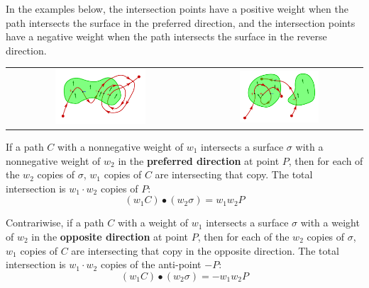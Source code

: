 \documentclass{book}
\begin{document}
In the examples below, the intersection points have a positive weight when the path intersects the surface in the preferred direction, and the intersection points have a negative weight when the path intersects the surface in the reverse direction.

\begin{tabular}{cc}
\includegraphics[width = 0.5\textwidth]{Intersections/Path-surface_intersections/path_surface_intersections}
& 
\includegraphics[width = 0.5\textwidth]{Intersections/Path-surface_intersections/path_surface_intersections_2}
\end{tabular}

If a path \(C\) with a nonnegative weight of \(w_1\) intersects a surface \(\sigma\) with a nonnegative weight of \(w_2\) in the {\bf preferred direction} at point \(P\), then for each of the \(w_2\) copies of \(\sigma\), \(w_1\) copies of \(C\) are intersecting that copy. The total intersection is \(w_1 \cdot w_2\) copies of \(P\):
\[(w_1 C) \bullet (w_2\sigma) = w_1 w_2 P\] 

Contrariwise, if a path \(C\) with a weight of \(w_1\) intersects a surface \(\sigma\) with a weight of \(w_2\) in the {\bf opposite direction} at point \(P\), then for each of the \(w_2\) copies of \(\sigma\), \(w_1\) copies of \(C\) are intersecting that copy in the opposite direction. The total intersection is \(w_1 \cdot w_2\) copies of the anti-point \(-P\):
\[(w_1 C) \bullet (w_2 \sigma) = -w_1 w_2 P\]  
\end{document}
